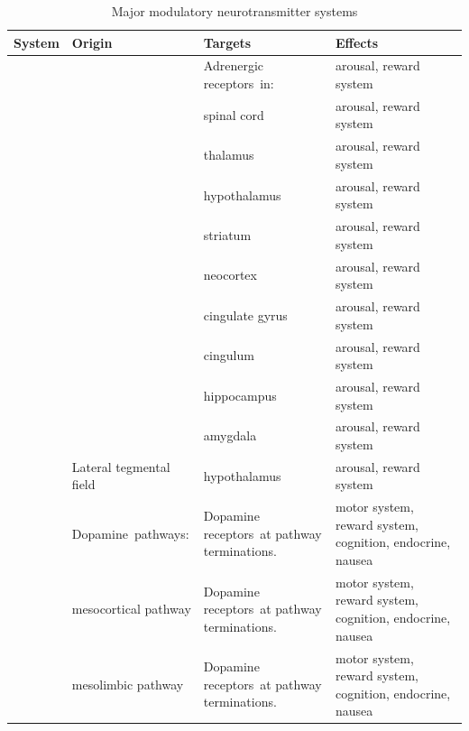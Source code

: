 \begin{longtable}[t]{>{\raggedright\arraybackslash}p{5em}>{\raggedright\arraybackslash}p{15em}>{\raggedright\arraybackslash}p{10em}>{\raggedright\arraybackslash}p{15em}}
\caption{\label{tab:modulators}Major modulatory neurotransmitter systems}\\
\toprule
System & Origin & Targets & Effects\\
\midrule
\rowcolor{gray!6}   &  & Adrenergic receptors in: & arousal,  reward system\\

 &  & spinal cord & arousal,  reward system\\

\rowcolor{gray!6}   &  & thalamus & arousal,  reward system\\

 &  & hypothalamus & arousal,  reward system\\

\rowcolor{gray!6}   &  & striatum & arousal,  reward system\\

 &  & neocortex & arousal,  reward system\\

\rowcolor{gray!6}   &  & cingulate gyrus & arousal,  reward system\\

 &  & cingulum & arousal,  reward system\\

\rowcolor{gray!6}   &  & hippocampus & arousal,  reward system\\

 & \multirow{-10}{15em}{\raggedright\arraybackslash Locus coeruleus} & amygdala & arousal,  reward system\\

\rowcolor{gray!6}  \multirow{-11}{5em}{\raggedright\arraybackslash Noradrenaline system} & Lateral tegmental field & hypothalamus & arousal,  reward system\\
\cmidrule{1-4}
 & Dopamine pathways: & Dopamine receptors at pathway terminations. & motor system, reward system, cognition, endocrine, nausea\\

\rowcolor{gray!6}   & mesocortical pathway & Dopamine receptors at pathway terminations. & motor system, reward system, cognition, endocrine, nausea\\

 & mesolimbic pathway & Dopamine receptors at pathway terminations. & motor system, reward system, cognition, endocrine, nausea\\


\end{longtable}
